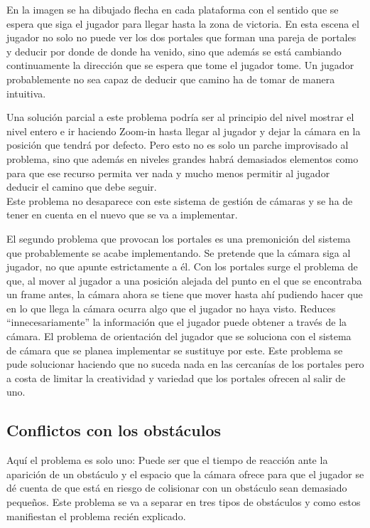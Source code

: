 En la imagen se ha dibujado flecha en cada plataforma con el sentido que se espera que siga el jugador para llegar hasta la zona de victoria. En esta escena el jugador no solo no puede ver los dos portales que forman una pareja de portales y deducir por donde de donde ha venido, sino que además se está cambiando continuamente la dirección que se espera que tome el jugador tome. Un jugador probablemente no sea capaz de deducir que camino ha de tomar de manera intuitiva.

Una solución parcial a este problema podría ser al principio del nivel mostrar el nivel entero e ir haciendo Zoom-in hasta llegar al jugador y dejar la cámara en la posición que tendrá por defecto. Pero esto no es solo un parche improvisado al problema, sino que además en niveles grandes habrá demasiados elementos como para que ese recurso permita ver nada y mucho menos permitir al jugador deducir el camino que debe seguir.\\
Este problema no desaparece con este sistema de gestión de cámaras y se ha de tener en cuenta en el nuevo que se va a implementar.

El segundo problema que provocan los portales es una premonición del sistema que probablemente se acabe implementando. Se pretende que la cámara siga al jugador, no que apunte estrictamente a él. Con los portales surge el problema de que, al mover al jugador a una posición alejada del punto en el que se encontraba un frame antes, la cámara ahora se tiene que mover hasta ahí pudiendo hacer que en lo que llega la cámara ocurra algo que el jugador no haya visto. Reduces “innecesariamente” la información que el jugador puede obtener a través de la cámara. El problema de orientación del jugador que se soluciona con el sistema de cámara que se planea implementar se sustituye por este. Este problema se pude solucionar haciendo que no suceda nada en las cercanías de los portales pero a costa de limitar la creatividad y variedad que los portales ofrecen al salir de uno.

\subsection{Conflictos con los obstáculos}
Aquí el problema es solo uno: Puede ser que el tiempo de reacción ante la aparición de un obstáculo y el espacio que la cámara ofrece para que el jugador se dé cuenta de que está en riesgo de colisionar con un obstáculo sean demasiado pequeños. Este problema se va a separar en tres tipos de obstáculos y como estos manifiestan el problema recién explicado.

